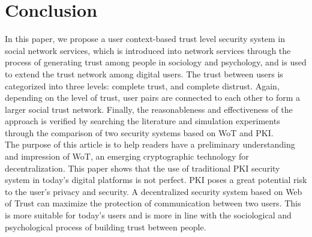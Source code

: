 \section{Conclusion}
In this paper, we propose a user context-based trust level security system in social 
network services, which is introduced into network services through the process of 
generating trust among people in sociology and psychology, and is used to extend the 
trust network among digital users\cite{b22}. The trust between users is categorized into three 
levels: complete trust, and complete distrust\cite{b10, b14}. Again, depending on the level 
of trust, user pairs are connected to each other to form a larger social trust network\cite{b20}. 
Finally, the reasonableness and effectiveness of the approach is verified by searching 
the literature and simulation experiments through the comparison of two security systems 
based on WoT and PKI\cite{b15, b16}.
\\
The purpose of this article is to help readers have a preliminary understanding and 
impression of WoT, an emerging cryptographic technology for decentralization\cite{b19}. This 
paper shows that the use of traditional PKI security system in today's digital platforms 
is not perfect. PKI poses a great potential risk to the user's privacy and security\cite{b21}. 
A decentralized security system based on Web of Trust can maximize the protection of 
communication between two users. This is more suitable for today's users and is more 
in line with the sociological and psychological process of building trust between people\cite{b24}.